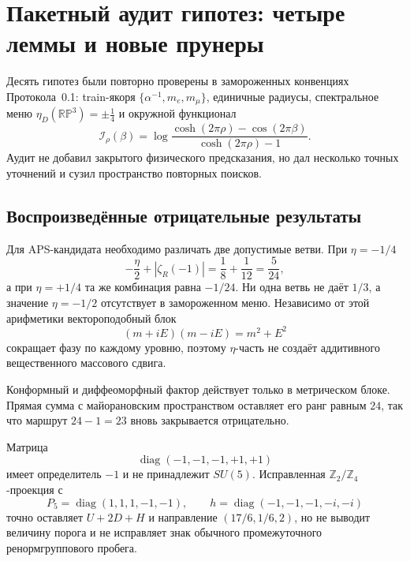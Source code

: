 \chapter{Пакетный аудит гипотез: четыре леммы и новые прунеры}

Десять гипотез были повторно проверены в замороженных конвенциях
Протокола~0.1: train-якоря \(\{\alpha^{-1},m_e,m_\mu\}\), единичные
радиусы, спектральное меню
\(\eta_D(\mathbb{RP}^3)=\pm\tfrac14\) и окружной функционал
\begin{equation}
 \mathcal I_\rho(\beta)=
 \log\frac{\cosh(2\pi\rho)-\cos(2\pi\beta)}
 {\cosh(2\pi\rho)-1}.
\end{equation}
Аудит не добавил закрытого физического предсказания, но дал несколько
точных уточнений и сузил пространство повторных поисков.

\section{Воспроизведённые отрицательные результаты}

Для APS-кандидата необходимо различать две допустимые ветви. При
\(\eta=-1/4\)
\begin{equation}
 -\frac{\eta}{2}+|\zeta_R(-1)|
 =\frac18+\frac1{12}=\frac5{24},
\end{equation}
а при \(\eta=+1/4\) та же комбинация равна \(-1/24\). Ни одна ветвь не
даёт \(1/3\), а значение \(\eta=-1/2\) отсутствует в замороженном меню.
Независимо от этой арифметики вектороподобный блок
\begin{equation}
 (m+iE)(m-iE)=m^2+E^2
\end{equation}
сокращает фазу по каждому уровню, поэтому \(\eta\)-часть не создаёт
аддитивного вещественного массового сдвига.

Конформный и диффеоморфный фактор действует только в метрическом блоке.
Прямая сумма с майорановским пространством оставляет его ранг равным
\(24\), так что маршрут \(24-1=23\) вновь закрывается отрицательно.

Матрица
\begin{equation}
 \operatorname{diag}(-1,-1,-1,+1,+1)
\end{equation}
имеет определитель \(-1\) и не принадлежит \(SU(5)\). Исправленная
\(\mathbb Z_2/\mathbb Z_4\)-проекция с
\begin{equation}
 P_5=\operatorname{diag}(1,1,1,-1,-1),\qquad
 h=\operatorname{diag}(-1,-1,-1,-i,-i)
\end{equation}
точно оставляет \(U+2D+H\) и направление
\((17/6,1/6,2)\), но не выводит величину порога и не исправляет знак
обычного промежуточного ренормгруппового пробега.

